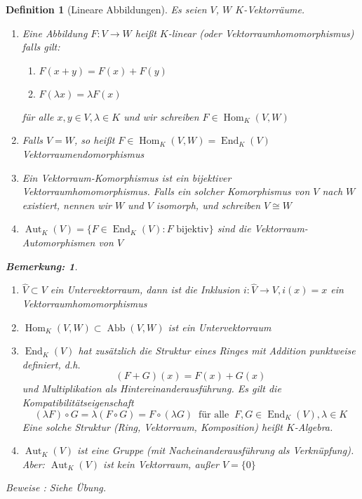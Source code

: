 \documentclass{report}
\newcommand{\IN}[1]{\index{#1|BH}}
\newcommand{\lb}{\lambda}
\DeclareMathOperator{\abb}{Abb}
\DeclareMathOperator{\Hom}{Hom}
\DeclareMathOperator{\End}{End}
\DeclareMathOperator{\Aut}{Aut}
\theoremstyle{customrem}
\newtheorem*{bem}{Bemerkung\textnormal:}
\theoremstyle{customdef}
\newtheorem{definition}{Definition}[chapter]
\begin{document}
	\begin{definition}[Lineare Abbildungen]
		\label{def31}
		\IN{Lineare!Abbildungen}
		Es seien $V$, $W$ $K$-Vektorräume.
		\begin{enumerate}
			\item Eine Abbildung $F : V \to W$ heißt $K$-linear (oder Vektorraumhomomorphismus) falls gilt:
			\begin{enumerate}[leftmargin=5cm]
				\item $F(x + y) = F(x) + F(y)$
				\item $F(\lb x) = \lb F(x)$
			\end{enumerate}
			für alle $x, y \in V, \lb \in K$ und wir schreiben $F \in \Hom_K(V, W)$
			
			\item Falls $V = W$, so heißt $F \in \Hom_K(V, W) = \End_K(V)$ Vektorraumendomorphismus
			\item Ein Vektorraum-Komorphismus ist ein bijektiver Vektorraumhomomorphismus. Falls ein solcher Komorphismus von $V$ nach $W$ existiert, nennen wir $W$ und $V$ isomorph, und schreiben $V \cong W$
			\item $\Aut_K(V) = \{F \in \End_K(V) : F \text{ bijektiv}\}$ sind die Vektorraum-Automorphismen von $V$
		\end{enumerate}
		\vspace{.1cm}
		\begin{bem}$ $
			\begin{enumerate}
				\item $\hat{V} \subset V$ ein Untervektorraum, dann ist die Inklusion $i : \hat{V} \to V, i(x) = x$ ein Vektorraumhomomorphismus
				\item $\Hom_K(V, W) \subset \abb(V, W)$ ist ein Untervektorraum
				\item $\End_K(V)$ hat zusätzlich die Struktur eines Ringes mit Addition punktweise definiert, d.h. $$(F + G)(x) = F(x) + G(x)$$ und Multiplikation als Hintereinanderausführung.
				Es gilt die Kompatibilitätseigenschaft
				$$(\lb F) \circ G = \lb (F \circ G) = F \circ (\lb G)\ \text{ für alle }\ F, G \in \End_K(V), \lb \in K$$
				Eine solche Struktur (Ring, Vektorraum, Komposition) heißt $K$-Algebra.
				
				\item $\Aut_K(V)$ ist eine Gruppe (mit Nacheinanderausführung als Verknüpfung). Aber: $\Aut_K(V)$ ist kein Vektorraum, außer $V = \{0\}$
			\end{enumerate}
		\end{bem}
		Beweise : Siehe Übung.\\
		

\end{definition}
\end{document}
